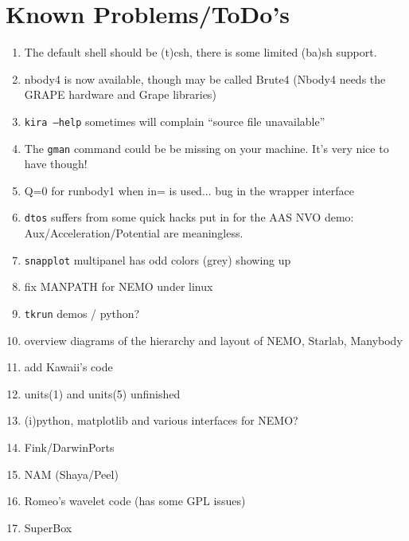 \section{Known Problems/ToDo's}
\begin{enumerate}

\item
The default shell should be (t)csh, there is some limited (ba)sh support. 

\item
nbody4 is now available, though may be called Brute4 (Nbody4 needs the
GRAPE hardware and Grape libraries)

\item
{\tt kira --help} sometimes will complain ``source file unavailable''

\item
The {\tt gman} command could be be missing on your machine. 
It's very nice to have though!

\item
Q=0 for runbody1 when in= is used...   bug in the wrapper interface

\item
{\tt dtos} suffers from some quick hacks put in for the AAS NVO demo:
Aux/Acceleration/Potential are meaningless.

\item
{\tt snapplot} multipanel has odd colors (grey) showing up

\item
fix MANPATH for NEMO under linux

\item
{\tt tkrun} demos / python?

\item
overview diagrams of the hierarchy and layout of NEMO, Starlab, Manybody

\item
add Kawaii's code

\item
units(1) and units(5) unfinished

\item
(i)python, matplotlib and various interfaces for NEMO?

\item
Fink/DarwinPorts

\item
NAM (Shaya/Peel)

\item
Romeo's wavelet code (has some GPL issues)

\item 
SuperBox


\end{enumerate}
